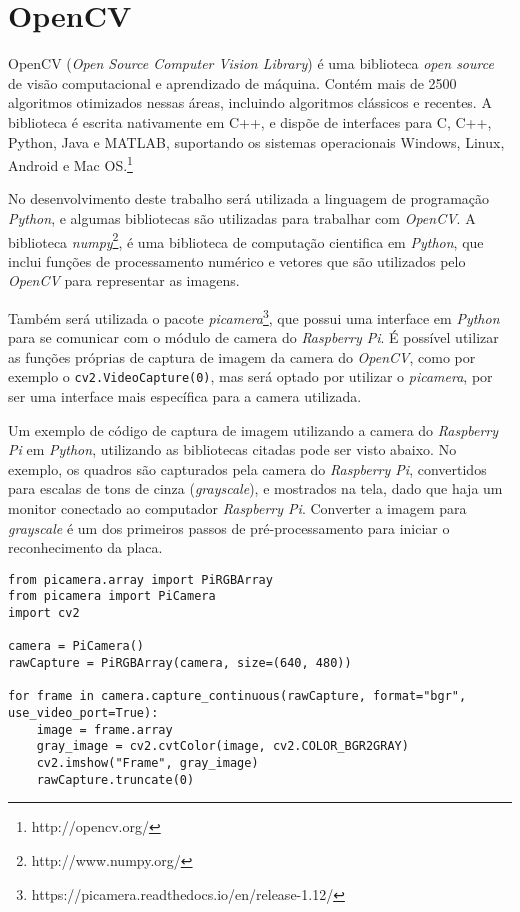\section{OpenCV}
\label{sec:opencv}

OpenCV (\emph{Open Source Computer Vision Library}) é uma biblioteca \emph{open
source} de visão computacional e aprendizado de máquina. Contém mais de 2500
algoritmos otimizados nessas áreas, incluindo algoritmos clássicos e recentes. A
biblioteca é escrita nativamente em C++, e dispõe de interfaces para C, C++,
Python, Java e MATLAB, suportando os sistemas operacionais Windows, Linux,
Android e Mac OS.\footnote{http://opencv.org/}

No desenvolvimento deste trabalho será utilizada a linguagem de programação \emph{Python},
e algumas bibliotecas são utilizadas para trabalhar com \emph{OpenCV}. A biblioteca
\emph{numpy}\footnote{http://www.numpy.org/}, é uma biblioteca de computação cientifica em
\emph{Python}, que inclui funções de processamento numérico e vetores que são utilizados
pelo \emph{OpenCV} para representar as imagens.

Também será utilizada o pacote \emph{picamera}\footnote{https://picamera.readthedocs.io/en/release-1.12/},
que possui uma interface em \emph{Python} para se comunicar com o módulo de camera do \emph{Raspberry Pi}.
É possível utilizar as funções próprias de captura de imagem da camera do \emph{OpenCV}, como por exemplo
o \texttt{cv2.VideoCapture(0)}, mas será optado por utilizar o \emph{picamera}, por ser uma interface mais
específica para a camera utilizada.

Um exemplo de código de captura de imagem utilizando a camera do \emph{Raspberry Pi} em \emph{Python}, utilizando
as bibliotecas citadas pode ser visto abaixo. No exemplo, os quadros são capturados pela camera do \emph{Raspberry Pi},
convertidos para escalas de tons de cinza (\emph{grayscale}), e mostrados na tela, dado que haja um monitor conectado ao
computador \emph{Raspberry Pi}. Converter a imagem para \emph{grayscale} é um dos primeiros passos de pré-processamento
para iniciar o reconhecimento da placa.

\begin{verbatim}
from picamera.array import PiRGBArray
from picamera import PiCamera
import cv2

camera = PiCamera()
rawCapture = PiRGBArray(camera, size=(640, 480))

for frame in camera.capture_continuous(rawCapture, format="bgr", use_video_port=True):
	image = frame.array
	gray_image = cv2.cvtColor(image, cv2.COLOR_BGR2GRAY)
	cv2.imshow("Frame", gray_image)
	rawCapture.truncate(0)
\end{verbatim}


